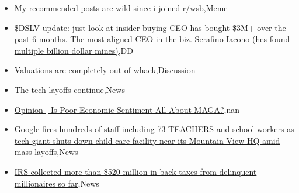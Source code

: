 \documentclass{article}%
\begin{document}
%
\begin{itemize}%
\item%
\href{https://reddit.com/r/wallstreetbets/comments/195kxpb/my\_recommended\_posts\_are\_wild\_since\_i\_joined\_rwsb/}{My recommended posts are wild since i joined r/wsb},Meme%
\item%
\href{https://reddit.com/r/Baystreetbets/comments/1955u3v/dslv\_update\_just\_look\_at\_insider\_buying\_ceo\_has/}{\$DSLV update: just look at insider buying CEO has bought \$3M+ over the past 6 months. The most aligned CEO in the biz. Serafino Iacono (hes found multiple billion dollar mines)},DD%
\item%
\href{https://reddit.com/r/StockMarket/comments/195773j/valuations\_are\_completely\_out\_of\_whack/}{Valuations are completely out of whack},Discussion%
\item%
\href{https://reddit.com/r/Economics/comments/195fu4r/the\_tech\_layoffs\_continue/}{The tech layoffs continue},News%
\item%
\href{https://reddit.com/r/Economics/comments/1959qod/opinion\_is\_poor\_economic\_sentiment\_all\_about\_maga/}{Opinion | Is Poor Economic Sentiment All About MAGA?},nan%
\item%
\href{https://reddit.com/r/Economics/comments/19582er/google\_fires\_hundreds\_of\_staff\_including\_73/}{Google fires hundreds of staff including 73 TEACHERS and school workers as tech giant shuts down child care facility near its Mountain View HQ amid mass layoffs},News%
\item%
\href{https://reddit.com/r/Economics/comments/1957ywm/irs\_collected\_more\_than\_520\_million\_in\_back\_taxes/}{IRS collected more than \$520 million in back taxes from delinquent millionaires so far},News%
\end{itemize}%
\end{document}
